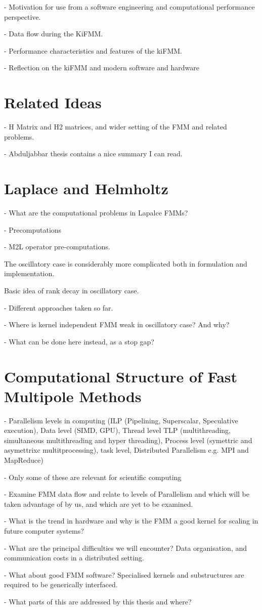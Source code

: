 - Motivation for use from a software engineering and computational performance perspective.

- Data flow during the KiFMM.

- Performance characteristics and features of the kiFMM.

- Reflection on the kiFMM and modern software and hardware


\section{Related Ideas}

- H Matrix and H2 matrices, and wider setting of the FMM and related problems.

- Abduljabbar thesis contains a nice summary I can read.




\section{Laplace and Helmholtz}

- What are the computational problems in Lapalce FMMs?

- Precomputations

- M2L operator pre-computations.

The oscillatory case is considerably more complicated both in formulation and implementation.

Basic idea of rank decay in oscillatory case.

- Different approaches taken so far.


- Where is kernel independent FMM weak in oscillatory case? And why?

- What can be done here instead, as a stop gap?




\section{Computational Structure of Fast Multipole Methods}

- Parallelism levels in computing (ILP (Pipelining, Superscalar, Speculative execution), Data level (SIMD, GPU), Thread level TLP (multithreading, simultaneous multithreading and hyper threading), Process level (symettric and asymettrixc multitprocessing), task level, Distributed Parallelism e.g. MPI and MapReduce)

- Only some of these are relevant for scientific computing

- Examine FMM data flow and relate to levels of Parallelism and which will be taken advantage of by us, and which are yet to be examined.


- What is the trend in hardware and why is the FMM a good kernel for scaling in future computer systems?

- What are the principal difficulties we will encounter? Data organisation, and communication costs in a distributed setting.

- What about good FMM software? Specialised kernels and substructures are required to be generically interfaced.

- What parts of this are addressed by this thesis and where?
